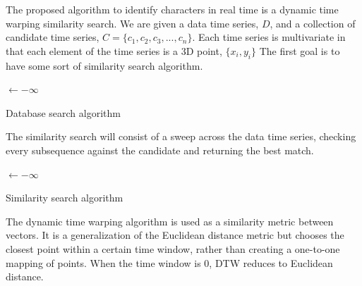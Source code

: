 The proposed algorithm to identify characters in real time is a dynamic time warping similarity search. 
We are given a data time series, \(D\), and a collection of candidate time series, \( C = \{c_1, c_2, c_3, ..., c_n\}\).
Each time series is multivariate in that each element of the time series is a 3D point, \(\{x_i, y_i\}\)
The first goal is to have some sort of similarity search algorithm.
\begin{algorithm}[h]



 \Input{\Collection, \D}
 \Best$\leftarrow -\infty$\;
 \Return{\Distance, \Location}
 \caption{Database search algorithm}
\end{algorithm}

The similarity search will consist of a sweep across the data time series, checking every subsequence against the candidate and returning the best match.
\begin{algorithm}[h]




 \Best$\leftarrow -\infty$\;
 \caption{Similarity search algorithm}
\end{algorithm}

The dynamic time warping algorithm is used as a similarity metric between vectors. It is a generalization of the Euclidean distance metric but chooses the closest point within a certain time window, rather than creating a one-to-one mapping of points. When the time window is 0, DTW reduces to Euclidean distance.


